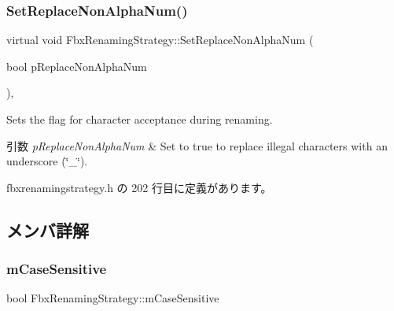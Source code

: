 \mbox{\label{class_fbx_renaming_strategy_a64ccadd7f74e58d706548e6333721558}} 
\subsubsection{\texorpdfstring{Set\+Replace\+Non\+Alpha\+Num()}{SetReplaceNonAlphaNum()}}
{\footnotesize\ttfamily virtual void Fbx\+Renaming\+Strategy\+::\+Set\+Replace\+Non\+Alpha\+Num (\begin{DoxyParamCaption}\item[{bool}]{p\+Replace\+Non\+Alpha\+Num }\end{DoxyParamCaption})\hspace{0.3cm}{\ttfamily [inline]}, {\ttfamily [virtual]}}

Sets the flag for character acceptance during renaming. 
\begin{DoxyParams}{引数}
{\em p\+Replace\+Non\+Alpha\+Num} & Set to {\ttfamily true} to replace illegal characters with an underscore (\char`\"{}\+\_\+\char`\"{}). \\
\hline
\end{DoxyParams}


 fbxrenamingstrategy.\+h の 202 行目に定義があります。



\subsection{メンバ詳解}
\mbox{\label{class_fbx_renaming_strategy_a6bce5341bf85474e9c3f0a891c18fc80}} 
\subsubsection{\texorpdfstring{m\+Case\+Sensitive}{mCaseSensitive}}
{\footnotesize\ttfamily bool Fbx\+Renaming\+Strategy\+::m\+Case\+Sensitive\hspace{0.3cm}{\ttfamily [protected]}}



